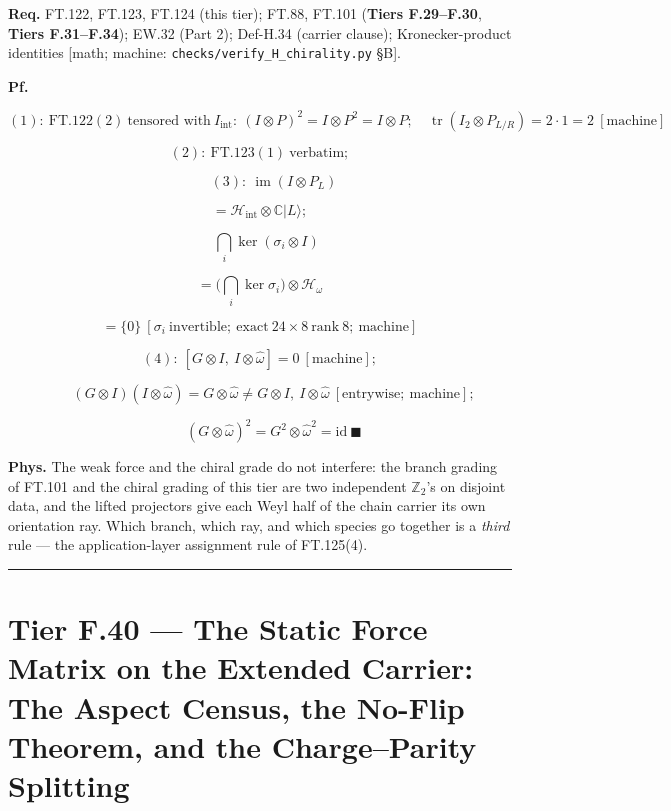 \begin{theorem}
\textbf{Req.} FT.122, FT.123, FT.124 (this tier); FT.88, FT.101 (\textbf{Tiers F.29–F.30}, \textbf{Tiers F.31–F.34}); EW.32 (Part 2); Def-H.34 (carrier clause); Kronecker-product identities [math; machine: \texttt{checks/\allowbreak{}verify\_\allowbreak{}H\_\allowbreak{}chirality.py} §B].

\textbf{Pf.}

\[
(1):\ \mathrm{FT.122}(2)\ \text{tensored with}\ I_{\mathrm{int}}:\ (I\otimes P)^2=I\otimes P^2=I\otimes P;\quad\operatorname{tr}(I_2\otimes P_{L/R})=2\cdot1=2\ [\text{machine}]
\]

\[
(2):\ \mathrm{FT.123}(1)\ \text{verbatim};
\]

\[
\qquad (3):\ \operatorname{im}(I\otimes P_L)
\]

\[
= \mathcal H_{\mathrm{int}}\otimes\mathbb C|L\rangle;
\]

\[
\quad\bigcap_i\ker(\sigma_i\otimes I)
\]

\[
= \bigl(\bigcap_i\ker\sigma_i\bigr)\otimes\mathcal H_\omega
\]

\[
= \{0\}\ [\sigma_i\ \text{invertible};\ \text{exact}\ 24\times8\ \text{rank}\ 8;\ \text{machine}]
\]

\[
(4):\ [G\otimes I,\ I\otimes\hat\omega]=0\ [\text{machine}];
\]

\[
\qquad (G\otimes I)(I\otimes\hat\omega)=G\otimes\hat\omega\ne G\otimes I,\ I\otimes\hat\omega\ [\text{entrywise};\ \text{machine}];
\]

\[
\qquad (G\otimes\hat\omega)^2=G^2\otimes\hat\omega^2=\mathrm{id}\ \blacksquare
\]

\textbf{Phys.} The weak force and the chiral grade do not interfere: the branch grading of FT.101 and the chiral grading of this tier are two independent $\mathbb Z_2$'s on disjoint data, and the lifted projectors give each Weyl half of the chain carrier its own orientation ray. Which branch, which ray, and which species go together is a \textit{third} rule — the application-layer assignment rule of FT.125(4).

\vspace{2pt}\noindent\rule{\textwidth}{0.4pt}\vspace{2pt}

\end{theorem}

\section[Tier F.40 — The Static Force Matrix on the Extended…]{\texorpdfstring{Tier F.40 — The Static Force Matrix on the Extended Carrier: The Aspect Census, the No-Flip Theorem, and the Charge–Parity Splitting}{Tier F.40 - The Static Force Matrix on the Extended Carrier: The Aspect Census, the No-Flip Theorem, and the Charge-Parity Splitting}}

